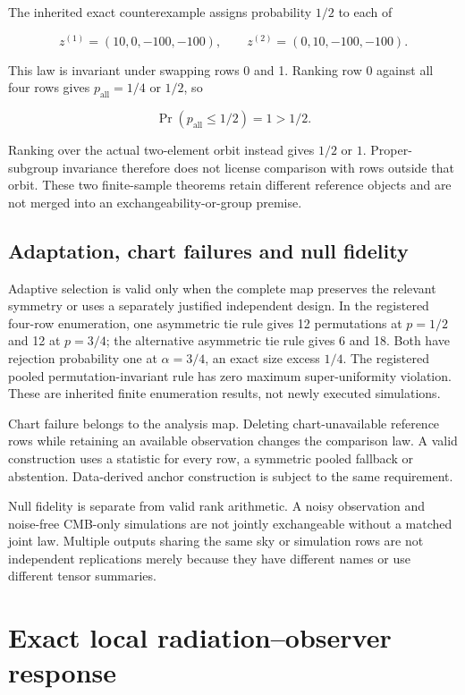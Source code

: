 \documentclass[
  11pt,
  a4paper]{article}
\begin{document}
The inherited exact counterexample assigns probability \(1/2\) to each of

\[
z^{(1)}=(10,0,-100,-100),\qquad
z^{(2)}=(0,10,-100,-100).
\]

This law is invariant under swapping rows 0 and 1. Ranking row 0 against all four rows gives \(p_{\mathrm{all}}=1/4\) or \(1/2\), so

\[
\Pr(p_{\mathrm{all}}\le1/2)=1>1/2.
\]

Ranking over the actual two-element orbit instead gives \(1/2\) or \(1\). Proper-subgroup invariance therefore does not license comparison with rows outside that orbit. These two finite-sample theorems retain different reference objects and are not merged into an exchangeability-or-group premise.

\hypertarget{adaptation-chart-failures-and-null-fidelity}{%
\subsection{Adaptation, chart failures and null fidelity}\label{adaptation-chart-failures-and-null-fidelity}}

Adaptive selection is valid only when the complete map preserves the relevant symmetry or uses a separately justified independent design. In the registered four-row enumeration, one asymmetric tie rule gives 12 permutations at \(p=1/2\) and 12 at \(p=3/4\); the alternative asymmetric tie rule gives 6 and 18. Both have rejection probability one at \(\alpha=3/4\), an exact size excess \(1/4\). The registered pooled permutation-invariant rule has zero maximum super-uniformity violation. These are inherited finite enumeration results, not newly executed simulations.

Chart failure belongs to the analysis map. Deleting chart-unavailable reference rows while retaining an available observation changes the comparison law. A valid construction uses a statistic for every row, a symmetric pooled fallback or abstention. Data-derived anchor construction is subject to the same requirement.

Null fidelity is separate from valid rank arithmetic. A noisy observation and noise-free CMB-only simulations are not jointly exchangeable without a matched joint law. Multiple outputs sharing the same sky or simulation rows are not independent replications merely because they have different names or use different tensor summaries.

\hypertarget{exact-local-radiationobserver-response}{%
\section{Exact local radiation--observer response}\label{exact-local-radiationobserver-response}}
\end{document}
